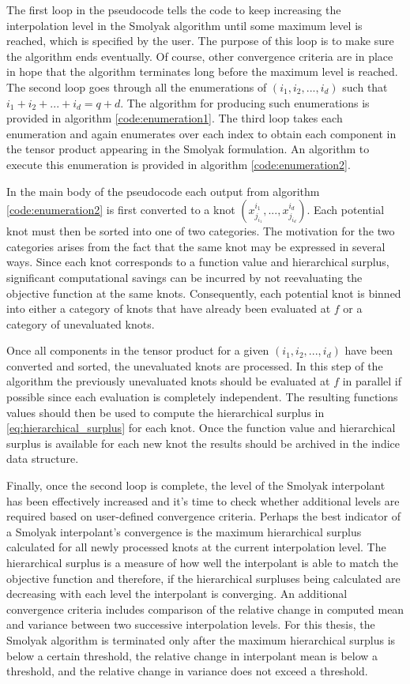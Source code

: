 The first loop in the pseudocode tells the code to keep increasing the interpolation level in the Smolyak algorithm until some maximum level is reached, which is specified by the user. The purpose of this loop is to make sure the algorithm ends eventually. Of course, other convergence criteria are in place in hope that the algorithm terminates long before the maximum level is reached. The second loop goes through all the enumerations of $(i_1,i_2,...,i_d)$ such that $i_1 + i_2 + ... + i_d = q+d$. The algorithm for producing such enumerations is provided in algorithm \ref{code:enumeration1}. The third loop takes each enumeration and again enumerates over each index to obtain each component in the tensor product appearing in the Smolyak formulation. An algorithm to execute this enumeration is provided in algorithm \ref{code:enumeration2}.

In the main body of the pseudocode each output from algorithm \ref{code:enumeration2} is first converted to a knot $(x^{i_1}_{j_{i_1}}, ..., x^{i_d}_{j_{i_d}})$. Each potential knot must then be sorted into one of two categories. The motivation for the two categories arises from the fact that the same knot may be expressed in several ways. Since each knot corresponds to a function value and hierarchical surplus, significant computational savings can be incurred by not reevaluating the objective function at the same knots. Consequently, each potential knot is binned into either a category of knots that have already been evaluated at $f$ or a category of unevaluated knots.

Once all components in the tensor product for a given $(i_1,i_2,...,i_d)$ have been converted and sorted, the unevaluated knots are processed. In this step of the algorithm the previously unevaluated knots should be evaluated at $f$ in parallel if possible since each evaluation is completely independent. The resulting functions values should then be used to compute the hierarchical surplus in \ref{eq:hierarchical_surplus} for each knot. Once the function value and hierarchical surplus is available for each new knot the results should be archived in the indice data structure.     

Finally, once the second loop is complete, the level of the Smolyak interpolant has been effectively increased and it's time to check whether additional levels are required based on user-defined convergence criteria. Perhaps the best indicator of a Smolyak interpolant's convergence is the maximum hierarchical surplus calculated for all newly processed knots at the current interpolation level. The hierarchical surplus is a measure of how well the interpolant is able to match the objective function and therefore, if the hierarchical surpluses being calculated are decreasing with each level the interpolant is converging. An additional convergence criteria includes comparison of the relative change in computed mean and variance between two successive interpolation levels. For this thesis, the Smolyak algorithm is terminated only after the maximum hierarchical surplus is below a certain threshold, the relative change in interpolant mean is below a threshold, and the relative change in variance does not exceed a threshold. 
